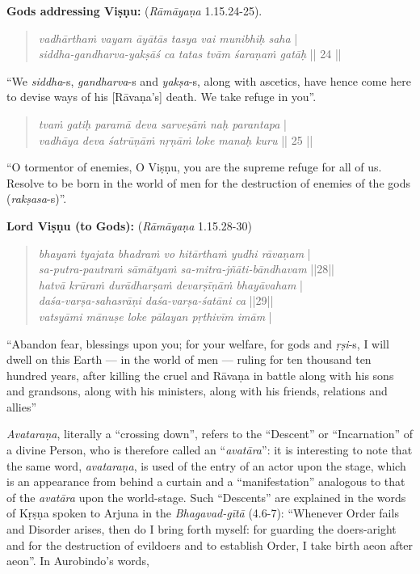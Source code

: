 \textbf{Gods addressing Viṣṇu:} ({\sl Rāmāyaṇa} 1.15.24-25). 
\begin{quote}
{\sl vadhārthaṁ vayam āyātās tasya vai munibhiḥ saha} |\\
{\sl siddha-gandharva-yakṣāś ca tatas tvām śaraṇaṁ gatāḥ} || 24 ||
\end{quote}

\begin{myquote}
“We {\sl siddha}-s, {\sl gandharva}-s and {\sl yakṣa}-s, along with ascetics, have hence come here to devise ways of his [Rāvaṇa’s] death. We take refuge in you”.
\end{myquote}
\begin{quote}
{{\sl tvaṁ gatiḥ paramā deva sarveṣāṁ naḥ parantapa}} |\\
{\sl vadhāya deva śatrūṇāṁ nṛṇāṁ loke manaḥ kuru} || 25 ||
\end{quote}

\begin{myquote}
“O tormentor of enemies, O Viṣṇu, you are the supreme refuge for all of us. Resolve to be born in the world of men for the destruction of enemies of the gods ({\sl rakṣasa}-s)”.
\end{myquote}

\textbf{Lord Viṣṇu (to Gods):} ({\sl Rāmāyaṇa} 1.15.28-30)

\begin{quote}
{{\sl bhayaṁ tyajata bhadraṁ vo hitārthaṁ yudhi rāvaṇam}} |\\
{\sl sa-putra-pautraṁ sāmātyaṁ sa-mitra-jñāti-bāndhavam} ||28||\\
{\sl hatvā krūraṁ durādharṣaṁ devarṣīṇāṁ bhayāvaham} |\\
{\sl daśa-varṣa-sahasrāṇi daśa-varṣa-śatāni ca} ||29||\\
{\sl vatsyāmi mānuṣe loke pālayan pṛthivīm imām} |
\end{quote}

\begin{myquote}
“Abandon fear, blessings upon you; for your welfare, for gods and {\sl ṛṣi}-s, I will dwell on this Earth --- in the world of men --- ruling for ten thousand ten hundred years, after killing the cruel and Rāvaṇa in battle along with his sons and grandsons, along with his ministers, along with his friends, relations and allies”
\end{myquote}

{\sl Avataraṇa}, literally a “crossing down”, refers to the “Descent” or “Incarnation” of a divine Person, who is therefore called an “{\sl avatāra}”: it is interesting to note that the same word, {\sl avataraṇa}, is used of the entry of an actor upon the stage, which is an appearance from behind a curtain and a “manifestation” analogous to that of the {\sl avatāra} upon the world-stage. Such “Descents” are explained in the words of Kṛṣṇa spoken to Arjuna in the {\sl Bhagavad-gītā} (4.6-7): “Whenever Order fails and Disorder arises, then do I bring forth myself: for guarding the doers-aright and for the destruction of evildoers and to establish Order, I take birth aeon after aeon”. In Aurobindo’s words,  

